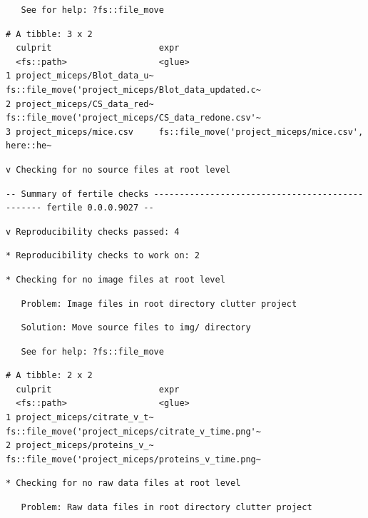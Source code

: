 \documentclass[12pt,twoside]{reedthesis}
\begin{document}
\begin{verbatim}
   See for help: ?fs::file_move
\end{verbatim}
\begin{verbatim}
# A tibble: 3 x 2
  culprit                     expr                                              
  <fs::path>                  <glue>                                            
1 project_miceps/Blot_data_u~ fs::file_move('project_miceps/Blot_data_updated.c~
2 project_miceps/CS_data_red~ fs::file_move('project_miceps/CS_data_redone.csv'~
3 project_miceps/mice.csv     fs::file_move('project_miceps/mice.csv', here::he~
\end{verbatim}
\begin{verbatim}
v Checking for no source files at root level
\end{verbatim}
\begin{verbatim}
-- Summary of fertile checks ------------------------------------------------ fertile 0.0.0.9027 --
\end{verbatim}
\begin{verbatim}
v Reproducibility checks passed: 4
\end{verbatim}
\begin{verbatim}
* Reproducibility checks to work on: 2
\end{verbatim}
\begin{verbatim}
* Checking for no image files at root level
\end{verbatim}
\begin{verbatim}
   Problem: Image files in root directory clutter project
\end{verbatim}
\begin{verbatim}
   Solution: Move source files to img/ directory
\end{verbatim}
\begin{verbatim}
   See for help: ?fs::file_move
\end{verbatim}
\begin{verbatim}
# A tibble: 2 x 2
  culprit                     expr                                              
  <fs::path>                  <glue>                                            
1 project_miceps/citrate_v_t~ fs::file_move('project_miceps/citrate_v_time.png'~
2 project_miceps/proteins_v_~ fs::file_move('project_miceps/proteins_v_time.png~
\end{verbatim}
\begin{verbatim}
* Checking for no raw data files at root level
\end{verbatim}
\begin{verbatim}
   Problem: Raw data files in root directory clutter project
\end{verbatim}
\end{document}

